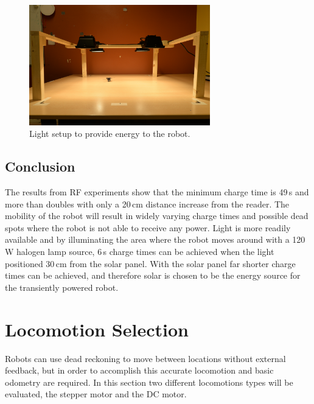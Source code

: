 \begin{figure}
	\centering
	\includegraphics[width=0.7\textwidth]{pics/light_setup.jpg}
	\caption{Light setup to provide energy to the robot.}
	\label{fig:light_setup}
\end{figure}

\subsection{Conclusion}

The results from RF experiments show that the minimum charge time is 49\,s and more than doubles with only a 20\,cm distance increase from the reader.
The mobility of the robot will result in widely varying charge times and possible dead spots where the robot is not able to receive any power.
Light is more readily available and by illuminating the area where the robot moves around with a 120\,W halogen lamp source, 6\,s charge times can be achieved when the light positioned 30\,cm from the solar panel.
With the solar panel far shorter charge times can be achieved, and therefore solar is chosen to be the energy source for the transiently powered robot.

\section{Locomotion Selection}
\label{sec:pre_locomotion_selection}

Robots can use dead reckoning to move between locations without external feedback, but in order to accomplish this accurate locomotion and basic odometry are required.
In this section two different locomotions types will be evaluated, the stepper motor and the DC motor.

